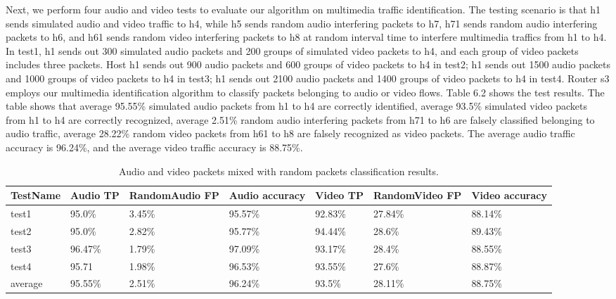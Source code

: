 \documentclass[master]{thesis}
\begin{document}
Next, we perform four audio and video tests to evaluate our algorithm on multimedia traffic identification. The testing scenario is that h1 sends simulated audio and video traffic to h4, while h5 sends random audio interfering packets to h7, h71 sends random audio interfering packets to h6, and h61 sends random video interfering packets to h8 at random interval time to interfere multimedia traffics from h1 to h4. In test1, h1 sends out 300 simulated audio packets and 200 groups of simulated video packets to h4, and each group of video packets includes three packets. Host h1 sends out 900 audio packets and 600 groups of video packets to h4 in test2; h1 sends out 1500 audio packets and 1000 groups of video packets to h4 in test3; h1 sends out 2100 audio packets and 1400 groups of video packets to h4 in test4. Router s3 employs our multimedia identification algorithm to classify packets belonging to audio or video flows. Table 6.2 shows the test results. The table shows that average 95.55\% simulated audio packets from h1 to h4 are correctly identified, average 93.5\% simulated video packets from h1 to h4 are correctly recognized, average 2.51\% random audio interfering packets from h71 to h6 are falsely classified belonging to audio traffic, average 28.22\% random video packets from h61 to h8 are falsely recognized as video packets. The average audio traffic accuracy is 96.24\%, and the average video traffic accuracy is 88.75\%.

\begin{table}[hp]
    \caption[Audio and video packets mixed with random packets classification results.]{Audio and video packets mixed with random packets classification results.}
    \label{table:t62}
    \begin{center}
        \begin{tabular}{@{}*{7}{l}} %
            \toprule %
            TestName	&Audio TP	&RandomAudio FP	&Audio accuracy 	&Video TP	&RandomVideo FP 	&Video accuracy \\
            \midrule %
		test1	&95.0\%	&3.45\%	&95.57\%	&92.83\%	&27.84\%	&88.14\% \\
		test2	&95.0\%	&2.82\%	&95.77\%	&94.44\%	&28.6\%	&89.43\% \\
		test3	&96.47\%	&1.79\%	&97.09\%	&93.17\%	&28.4\%	&88.55\% \\
		test4	&95.71	&1.98\%	&96.53\%	&93.55\%	&27.6\%	&88.87\% \\
		average	&95.55\%	&2.51\%	&96.24\%	&93.5\%	&28.11\%	&88.75\% \\
            \bottomrule %
        \end{tabular}
    \end{center}
\end{table}
\end{document}
